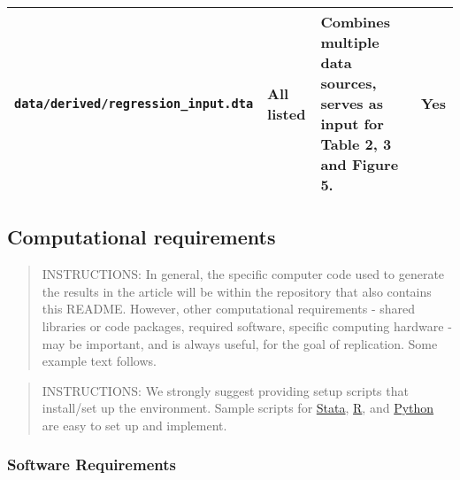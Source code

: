 \documentclass[
]{article}
\begin{document}
\begin{longtable}[]{@{}llll@{}}
\begin{minipage}[t]{0.26\columnwidth}\raggedright
\texttt{data/derived/regression\_input.dta}\strut
\end{minipage} & \begin{minipage}[t]{0.19\columnwidth}\raggedright
All listed\strut
\end{minipage} & \begin{minipage}[t]{0.23\columnwidth}\raggedright
Combines multiple data sources, serves as input for Table 2, 3 and
Figure 5.\strut
\end{minipage} & \begin{minipage}[t]{0.21\columnwidth}\raggedright
Yes\strut
\end{minipage}\tabularnewline
\bottomrule
\end{longtable}

\hypertarget{computational-requirements}{%
\subsection{Computational
requirements}\label{computational-requirements}}

\begin{quote}
INSTRUCTIONS: In general, the specific computer code used to generate
the results in the article will be within the repository that also
contains this README. However, other computational requirements - shared
libraries or code packages, required software, specific computing
hardware - may be important, and is always useful, for the goal of
replication. Some example text follows.
\end{quote}

\begin{quote}
INSTRUCTIONS: We strongly suggest providing setup scripts that
install/set up the environment. Sample scripts for
\href{https://github.com/gslab-econ/template/blob/master/config/config_stata.do}{Stata},
\href{https://github.com/labordynamicsinstitute/paper-template/blob/master/programs/global-libraries.R}{R},
and \href{https://pip.readthedocs.io/en/1.1/requirements.html}{Python}
are easy to set up and implement.
\end{quote}

\hypertarget{software-requirements}{%
\subsubsection{Software Requirements}\label{software-requirements}}
\end{document}

